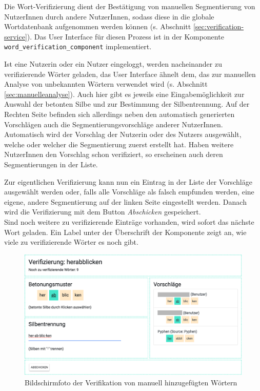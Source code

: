 Die Wort-Verifizierung dient der Bestätigung von manuellen Segmentierung von NutzerInnen durch andere NutzerInnen, sodass diese in die globale Wortdatenbank aufgenommen werden können (s. Abschnitt \ref{sec:verification-service}). Das User Interface für diesen Prozess ist in der Komponente \texttt{word\_verification\_component} implementiert.

Ist eine Nutzerin oder ein Nutzer eingeloggt, werden nacheinander zu verifizierende Wörter geladen, das User Interface ähnelt dem, das zur manuellen Analyse von unbekannten Wörtern verwendet wird (s. Abschnitt \ref{sec:manuelleanalyse}). Auch hier gibt es jeweils eine Eingabemöglichkeit zur Auswahl der betonten Silbe und zur Bestimmung der Silbentrennung. Auf der Rechten Seite befinden sich allerdings neben den automatisch generierten Vorschlägen auch die Segmentierungsvorschläge anderer NutzerInnen. Automatisch wird der Vorschlag der Nutzerin oder des Nutzers ausgewählt, welche oder welcher die Segmentierung zuerst erstellt hat. Haben weitere NutzerInnen den Vorschlag schon verifiziert, so erscheinen auch deren Segmentierungen in der Liste.

Zur eigentlichen Verifizierung kann nun ein Eintrag in der Liste der Vorschläge ausgewählt werden oder, falls alle Vorschläge als falsch empfunden werden, eine eigene, andere Segmentierung auf der linken Seite eingestellt werden. Danach wird die Verifizierung mit dem Button \textit{Abschicken} gespeichert.\\
Sind noch weitere zu verifizierende Einträge vorhanden, wird sofort das nächste Wort geladen. Ein Label unter der Überschrift der Komponente zeigt an, wie viele zu verifizierende Wörter es noch gibt.

\begin{figure}[h!]
	\centering
	\includegraphics[width=.8\linewidth]{figures/frontend/verifizierung}
	\caption{Bildschirmfoto der Verifikation von manuell hinzugefügten Wörtern}
	\label{fig:frontend-verification}
\end{figure}
